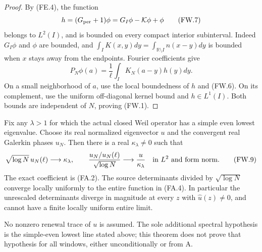 \begin{proof}
By (FE.4), the function
\[
 h=(G_{\rm per}+1)\phi=G_I\phi-\mathcal K\phi+\phi       \tag{FW.7}
\]
belongs to \(L^2(I)\), and is bounded on every compact interior
subinterval.  Indeed \(G_I\phi\) and \(\phi\) are bounded,
and
\(\int_I K(x,y)dy=\int_{\mathbb R\setminus I}n(x-y)dy\)
is bounded when \(x\) stays away from the endpoints.
Fourier coefficients give
\[
                   P_N\phi(a)=\frac1\ell
                             \int_I K_N(a-y)h(y)dy.      \tag{FW.8}
\]
On a small neighborhood of \(a\), use the local boundedness
of \(h\) and (FW.6).  On its complement, use the uniform
off-diagonal kernel bound and \(h\in L^1(I)\).
Both bounds are independent of \(N\), proving (FW.1).
\end{proof}

\begin{theorem}
\label{AC-S42}
Fix any \(\lambda>1\) for which the actual closed Weil operator
has a simple even lowest eigenvalue.  Choose its real normalized
eigenvector \(u\) and the convergent real Galerkin phases \(u_N\).
Then there is a real \(\kappa_\lambda\ne0\) such that
\[
 \sqrt{\log N}\,u_N(\ell)\longrightarrow\kappa_\lambda,
 \qquad
 \frac{u_N/u_N(\ell)}{\sqrt{\log N}}
                   \longrightarrow\frac{u}{\kappa_\lambda}
                         \quad\hbox{in }L^2\hbox{ and form norm}.
                                                        \tag{FW.9}
\]
The exact coefficient is (FA.2).  The source determinants divided
by \(\sqrt{\log N}\) converge locally uniformly to the entire
function in (FA.4).  In particular the unrescaled determinants
diverge in magnitude at every \(z\) with \(\widehat u(z)\ne0\),
and cannot have a finite locally uniform entire limit.

No nonzero renewal trace of \(u\) is assumed.  The sole additional
spectral hypothesis is the simple-even lowest line stated above;
this theorem does not prove that hypothesis for all windows,
either unconditionally or from A.
\end{theorem}
